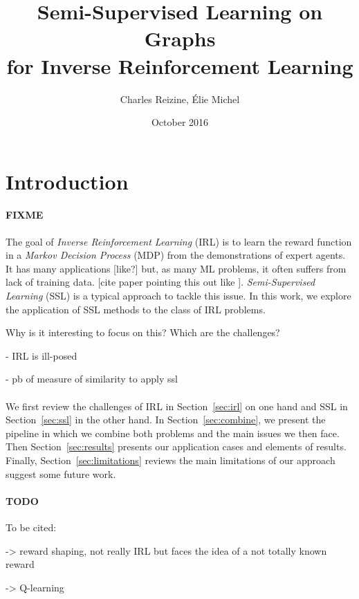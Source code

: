 \documentclass{article}
\title{Semi-Supervised Learning on Graphs \\
for Inverse Reinforcement Learning}
\author{Charles Reizine, Élie Michel}
\date{October 2016}
\begin{document}
\maketitle

\section{Introduction}

\paragraph{FIXME}
The goal of \emph{Inverse Reinforcement Learning} (IRL) is to learn the reward function in a \emph{Markov Decision Process} (MDP) from the demonstrations of expert agents. It has many applications [like?] but, as many ML problems, it often suffers from lack of training data. [cite paper pointing this out like \cite{Vasquez14}]. \emph{Semi-Supervised Learning} (SSL) is a typical approach to tackle this issue. In this work, we explore the application of SSL methods to the class of IRL problems.

Why is it interesting to focus on this?
Which are the challenges?

 - IRL is ill-posed

 - pb of measure of similarity to apply ssl

\paragraph{}
We first review the challenges of IRL in Section~\ref{sec:irl} on one hand and SSL in Section~\ref{sec:ssl} in the other hand. In Section~\ref{sec:combine}, we present the pipeline in which we combine both problems and the main issues we then face. Then Section~\ref{sec:results} presents our application cases and elements of results. Finally, Section~\ref{sec:limitations} reviews the main limitations of our approach suggest some future work.


\paragraph{TODO} To be cited:

\cite{Ng99} -> reward shaping, not really IRL but faces the idea of a not totally known reward

\cite{Abbeel04}

\cite{Watkins92} -> Q-learning

\end{document}
